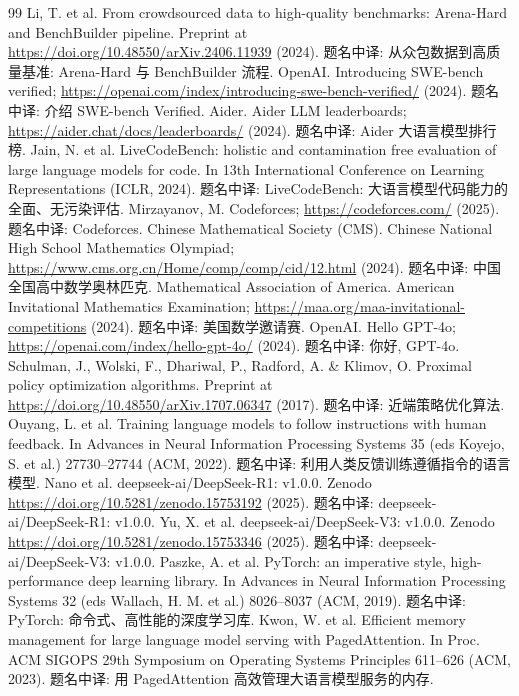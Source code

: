 \begin{thebibliography}{99}
 Li, T. et al. From crowdsourced data to high-quality benchmarks: Arena-Hard and BenchBuilder pipeline. Preprint at \url{https://doi.org/10.48550/arXiv.2406.11939} (2024). 题名中译: 从众包数据到高质量基准: Arena-Hard 与 BenchBuilder 流程.
 OpenAI. Introducing SWE-bench verified; \url{https://openai.com/index/introducing-swe-bench-verified/} (2024). 题名中译: 介绍 SWE-bench Verified.
 Aider. Aider LLM leaderboards; \url{https://aider.chat/docs/leaderboards/} (2024). 题名中译: Aider 大语言模型排行榜.
 Jain, N. et al. LiveCodeBench: holistic and contamination free evaluation of large language models for code. In 13th International Conference on Learning Representations (ICLR, 2024). 题名中译: LiveCodeBench: 大语言模型代码能力的全面、无污染评估.
 Mirzayanov, M. Codeforces; \url{https://codeforces.com/} (2025). 题名中译: Codeforces.
 Chinese Mathematical Society (CMS). Chinese National High School Mathematics Olympiad; \url{https://www.cms.org.cn/Home/comp/comp/cid/12.html} (2024). 题名中译: 中国全国高中数学奥林匹克.
 Mathematical Association of America. American Invitational Mathematics Examination; \url{https://maa.org/maa-invitational-competitions} (2024). 题名中译: 美国数学邀请赛.
 OpenAI. Hello GPT-4o; \url{https://openai.com/index/hello-gpt-4o/} (2024). 题名中译: 你好, GPT-4o.
 Schulman, J., Wolski, F., Dhariwal, P., Radford, A. \& Klimov, O. Proximal policy optimization algorithms. Preprint at \url{https://doi.org/10.48550/arXiv.1707.06347} (2017). 题名中译: 近端策略优化算法.
 Ouyang, L. et al. Training language models to follow instructions with human feedback. In Advances in Neural Information Processing Systems 35 (eds Koyejo, S. et al.) 27730--27744 (ACM, 2022). 题名中译: 利用人类反馈训练遵循指令的语言模型.
 Nano et al. deepseek-ai/DeepSeek-R1: v1.0.0. Zenodo \url{https://doi.org/10.5281/zenodo.15753192} (2025). 题名中译: deepseek-ai/DeepSeek-R1: v1.0.0.
 Yu, X. et al. deepseek-ai/DeepSeek-V3: v1.0.0. Zenodo \url{https://doi.org/10.5281/zenodo.15753346} (2025). 题名中译: deepseek-ai/DeepSeek-V3: v1.0.0.
 Paszke, A. et al. PyTorch: an imperative style, high-performance deep learning library. In Advances in Neural Information Processing Systems 32 (eds Wallach, H. M. et al.) 8026--8037 (ACM, 2019). 题名中译: PyTorch: 命令式、高性能的深度学习库.
 Kwon, W. et al. Efficient memory management for large language model serving with PagedAttention. In Proc. ACM SIGOPS 29th Symposium on Operating Systems Principles 611--626 (ACM, 2023). 题名中译: 用 PagedAttention 高效管理大语言模型服务的内存.
\end{thebibliography}

